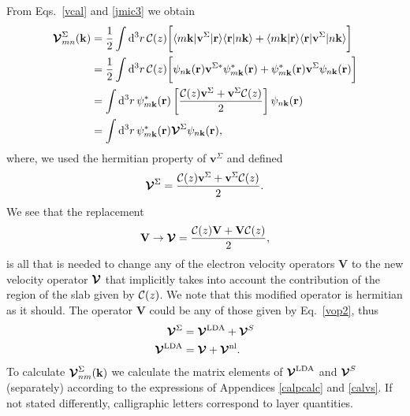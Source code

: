 \documentclass[floatfix,prb,aps,superscriptaddress,showpacs,11pt,preprint,letterpaper]{revtex4}
\begin{document}
From
Eqs.~\eqref{vcal} and \eqref{jmic3} we obtain
\begin{align*}
{\boldsymbol{\mathcal{V}}}^{\Sigma}_{mn}({\mathbf k})
&=
\frac{1}{2}
\int \mathrm{d}^3 r\,
 {\mathbf{\cal C}}(z)
\bigg[
\langle m\mathbf{k}|\mathbf{v}^\Sigma | \mathbf{r}\rangle
\langle \mathbf{r} | n \mathbf k \rangle +
\langle m\mathbf{k} | \mathbf{r}\rangle
\langle \mathbf{r} | \mathbf{v}^\Sigma | n \mathbf k \rangle\bigg]
\nonumber\\
&=
\frac{1}{2}
\int \mathrm{d}^3 r\,
 {\mathbf{\cal C}}(z)
 \bigg[
\psi_{n\mathbf{k}}(\mathbf{r})
\mathbf{v}^{\Sigma *}\psi^*_{m\mathbf{k}}(\mathbf{r})
+ 
\psi^*_{m\mathbf{k}}(\mathbf{r})\mathbf{v}^\Sigma
\psi_{n\mathbf{k}}(\mathbf{r})
\bigg]
\nonumber\\
&=
\int \mathrm{d}^3 r\,
\psi^*_{m\mathbf{k}}(\mathbf{r})
\left[\frac{{\mathbf{\cal C}}(z) \mathbf{v}^\Sigma +
\mathbf{v}^\Sigma {\mathbf{\cal C}}(z)}{2}\right]
\psi_{n\mathbf{k}}(\mathbf{r})
\nonumber\\
&=
\int \mathrm{d}^3 r\,
\psi^*_{m\mathbf{k}}(\mathbf{r})
\boldsymbol{\mathcal{\cal V}}^{\Sigma}
\psi_{n\mathbf{k}}(\mathbf{r})
,
\end{align*}
where, we used the hermitian property of $\mathbf{v}^\Sigma$ and defined
\begin{equation*}
\boldsymbol{\mathcal{\cal V}}^{\Sigma}
=
\frac{{\mathbf{\cal C}}(z) \mathbf{v}^\Sigma +
\mathbf{v}^\Sigma {\mathbf{\cal C}}(z)}{2}
.
\end{equation*} 
We see that the replacement
\begin{equation}
\mathbf{V} \to \boldsymbol{\mathcal{\cal V}}=\frac{{\mathbf{\cal C}}(z) \mathbf{V} +
\mathbf{V} {\mathbf{\cal C}}(z)}{2}
,
\label{vcali}
\end{equation} 
is all that is needed to change any of the
electron velocity operators $\mathbf{V}$ to the new velocity
operator $\boldsymbol{\mathcal{\cal V}}$ that implicitly takes into account the
contribution of the region of the slab given by ${\mathbf{\cal C}}(z)$.
We note that this modified operator is hermitian as it should.\cite{note2}
The operator $\mathbf{V}$ could be any of those given by Eq.~\eqref{vop2},
thus
\begin{align*}
\boldsymbol{\mathcal{\cal V}}^{\Sigma}
&=
\boldsymbol{\mathcal{\cal V}}^{\mathrm{LDA}}
+
\boldsymbol{\mathcal{\cal V}}^{S}
\nonumber\\
\boldsymbol{\mathcal{\cal V}}^{\mathrm{LDA}}
&=
\boldsymbol{\mathcal{\cal V}}
+
\boldsymbol{\mathcal{\cal V}}^{\mathrm{nl}}
.
\end{align*}
To calculate
$\boldsymbol{\mathcal{\cal V}}^{\Sigma}_{nm}(\mathbf{k})$ 
we calculate the matrix elements of 
$\boldsymbol{\mathcal{\cal V}}^{\mathrm{LDA}}$ and $\boldsymbol{\mathcal{\cal V}}^{S}$
 (separately)
according to the expressions of
Appendices \ref{calpcalc} and \ref{calvs}.
If not stated differently, calligraphic letters correspond to layer quantities. 
\end{document}

